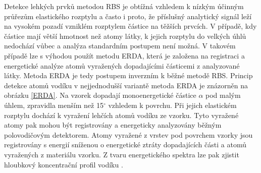 Detekce lehkých prvků metodou RBS je obtížná vzhledem k nízkým účinným průřezům elastického rozptylu a často i proto, že příslušný analytický signál leží na vysokém pozadí vzniklém rozptylem částice na těžších prvcích. 
V případě, kdy částice mají větší hmotnost než atomy látky, k jejich rozptylu do velkých úhlů nedochází vůbec a analýza standardním postupem není možná. V takovém případě lze s výhodou použít metodu ERDA, která je založena na registraci a energetické analýze atomů vyražených dopadajícími částicemi z analyzované látky. 
Metoda ERDA je tedy postupem inverzním k běžné metodě RBS. Princip detekce atomů vodíku v nejjednodušší variantě metoda ERDA je znázorněn na obrázku \ref{ERDA}. Na vzorek dopadají monoenergetické částice $\alpha$ pod malým úhlem, zpravidla menším než 15$^\circ$ vzhledem k povrchu. 
Při jejich elastickém rozptylu dochází k vyražení lehčích atomů vodíku ze vzorku. Tyto vyražené atomy pak mohou být registrovány a energeticky analyzovány běžným polovodičovým detektorem. 
Atomy vyražené z vrstev pod povrchem vzorky jsou registrovány s energií sníženou o energetické ztráty dopadajících části a atomů vyražených z materiálu vzorku. Z tvaru energetického spektra lze pak zjistit hloubkový koncentrační profil vodíku \cite{Kral2002}. 

\cleardoublepage
